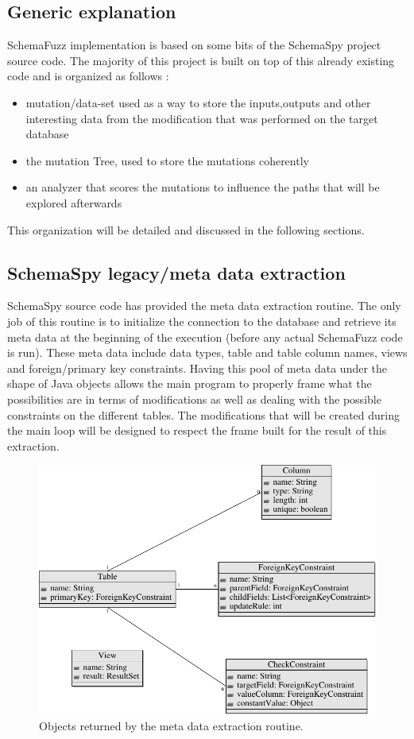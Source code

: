 \documentclass{article}
\begin{document}
\begin{empfile}
		\subsection{Generic explanation}
SchemaFuzz implementation is based on some bits of the SchemaSpy project source code.
The majority of this project is built on top of this already existing code and is organized as follows :
		\begin{itemize}
		\item{mutation/data-set used as a way to store the inputs,outputs and other interesting data from the modification that was performed on the target database}
		\item{the mutation Tree, used to store the mutations coherently}
		\item{an analyzer that scores the mutations to influence the paths that will be explored afterwards}
		\end{itemize}
		 
This organization will be detailed and discussed in the following sections.
		\subsection{SchemaSpy legacy/meta data extraction}
SchemaSpy source code has provided the meta data extraction routine. The only job of this routine is to initialize the connection to the database and retrieve its meta data at the   beginning of the execution (before any actual SchemaFuzz code is run). These meta data include data types, table and table column names, views and foreign/primary key constraints. Having this pool of meta data under the shape of Java objects allows the main program to properly frame what the possibilities are in terms of modifications as well as dealing with the possible constraints on the different tables. The modifications that will be created during the main loop will be designed to respect the frame built for the result of this extraction.

\clearpage

\begin{figure} [h!]
\centering
\includegraphics[width=\textwidth]{MetaDataExtractionDiagram-1.pdf}
\caption{Objects returned by the meta data extraction routine.}
\end{figure}


\end{empfile}
\end{document}
